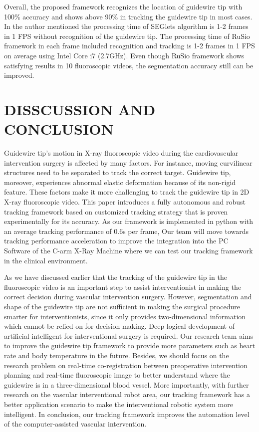 \documentclass[letterpaper, 10 pt, conference]{ieeeconf}  %
\begin{document}
Overall, the proposed framework recognizes  the location of guidewire tip with 100\% accuracy and shows above 90\% in tracking the guidewire tip in most cases. In  \cite{c8} the author mentioned the processing time of  SEGlets algorithm is 1-2 frames in 1 FPS without recognition of the guidewire tip. The processing time of RuSio framework in each frame included recognition and tracking is 1-2 frames in 1 FPS on average using Intel Core i7 (2.7GHz). Even though RuSio framework shows satisfying results in 10 fluoroscopic videos, the segmentation accuracy still can be improved.


\section{DISSCUSSION AND CONCLUSION}

Guidewire tip's motion in X-ray fluoroscopic video during the cardiovascular intervention surgery is affected by many factors. For instance, moving curvilinear structures need to be separated to track the correct target. Guidewire tip, moreover, experiences abnormal elastic deformation because of its non-rigid feature. These factors make it more challenging to track the guidewire tip in 2D X-ray fluoroscopic video. This paper introduces a fully autonomous and robust tracking framework based on customized tracking strategy that is proven experimentally for its accuracy. As our framework is implemented in python with an average tracking performance of 0.6s per frame, Our team will move towards tracking performance acceleration to improve the integration into the PC Software of the C-arm X-Ray Machine where we can test our tracking framework in the clinical environment. 

As we have discussed earlier that the tracking of the guidewire tip in the fluoroscopic video is an important step to assist interventionist in making the correct decision during vascular intervention surgery. However, segmentation and shape of the guidewire tip are not sufficient in making the surgical procedure smarter for interventionists, since it only provides two-dimensional information which cannot be relied on for decision making. Deep logical development of artificial intelligent for interventional surgery is required. Our research team aims to improve the guidewire tip framework to provide more parameters such as heart rate and body temperature in the future. Besides, we should focus on the research problem on real-time co-registration between preoperative intervention planning and real-time fluoroscopic image to better understand where the guidewire is in a three-dimensional blood vessel. More importantly, with further research on the vascular interventional robot area, our tracking framework has a better application scenario to make the interventional robotic system more intelligent. In conclusion, our tracking framework improves the automation level of the computer-assisted vascular intervention.
\end{document}
